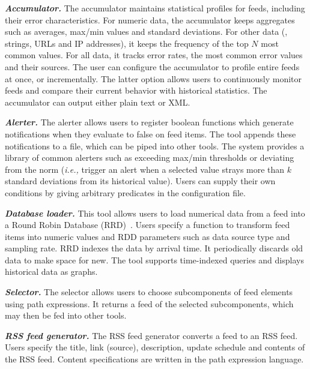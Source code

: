 \textbf{\textit{Accumulator.}} The accumulator
maintains statistical profiles for feeds, including their error characteristics. For
numeric data, the accumulator keeps aggregates such
as averages, max/min values and standard deviations. For other
data (\eg{}, strings, URLs and IP addresses), it keeps the
frequency of the top $N$ most common values. For all data, it
tracks error rates, the most common error values and their
sources.  The user can configure the accumulator to profile entire
feeds at once, or incrementally. The latter option 
allows users to continuously monitor feeds
and compare their current behavior with historical statistics.  The
accumulator can output either plain text or XML. 

\textbf{\textit{Alerter.}} The alerter allows users to register boolean 
functions which generate notifications when they evaluate to false on
feed items. The tool appends these notifications to a file, which can
be piped into other tools.  The system provides a library of 
common alerters such as exceeding max/min thresholds or deviating from the norm
({\em i.e.,} trigger an alert when a selected value strays more than $k$
standard deviations from its historical value). 
Users can supply their own conditions by giving arbitrary \ocaml{} predicates
in the configuration file.

\textbf{\textit{Database loader.}} This tool allows users to load numerical
data from a feed into a Round Robin Database
(RRD)~\cite{rrdtool}. Users specify a function to transform
feed items into numeric values and RDD parameters such as data source 
type and sampling rate. RRD indexes the data by arrival time.  It
periodically discards old data to make space for new. The tool
supports time-indexed queries and displays historical data as graphs.

\textbf{\textit{Selector.}} The selector allows users to choose
subcomponents of feed elements using path expressions. It returns a
feed of the selected subcomponents, which may then be fed into other
tools. 


\textbf{\textit{RSS feed generator.}} The RSS feed generator converts a
\padsd{} feed to an RSS feed. Users specify the title, link (source),
description, update schedule and contents of the RSS feed.  Content
specifications are written in the path expression language.


